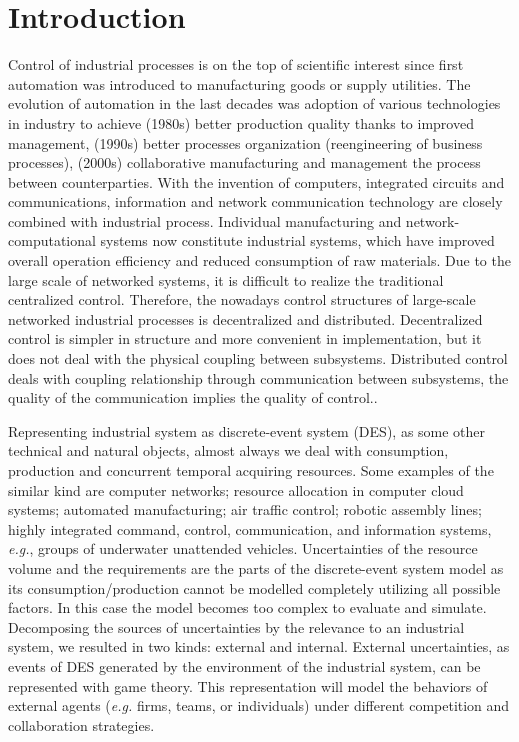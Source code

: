 \documentclass[runningheads]{llncs}
\begin{document}
\section*{Introduction}
\label{sec:intro}

Control of industrial processes is on the top of scientific interest since first automation was introduced to manufacturing goods or supply utilities. The evolution of automation in the last decades was adoption of various technologies in industry to achieve (1980s) better production quality thanks to improved management, (1990s) better processes organization (reengineering of business processes), (2000s) collaborative manufacturing and management the process between counterparties. With the invention of computers, integrated circuits and communications, information and network communication technology are closely combined with industrial process. Individual manufacturing and network-computational systems now constitute industrial systems, which have improved overall operation efficiency and reduced consumption of raw materials. Due to the large scale of networked systems, it is difficult to realize the traditional centralized control. Therefore, the nowadays control structures of large-scale networked industrial processes is decentralized and distributed. Decentralized control is simpler in structure and more convenient in implementation, but it does not deal with the physical coupling between subsystems. Distributed control deals with coupling relationship through communication between subsystems, the quality of the communication implies the quality of control..


Representing industrial system as discrete-event system (DES), as some other technical and natural objects, almost always we deal with consumption, production and concurrent temporal acquiring resources. Some examples of the similar kind are computer networks; resource allocation in computer cloud systems; automated manufacturing; air traffic control; robotic assembly lines; highly integrated command, control, communication, and information systems, \emph{e.g.}, groups of underwater unattended vehicles.  Uncertainties of the resource volume and the requirements are the parts of the discrete-event system model as its consumption/production cannot be modelled completely utilizing all possible factors. In this case the model becomes too complex to evaluate and simulate. Decomposing the sources of uncertainties by the relevance to an industrial system, we resulted in two kinds: external and internal.  External uncertainties, as events of DES generated by the environment of the industrial system, can be represented with game theory.  This representation will model the behaviors of external agents (\emph{e.g.} firms, teams, or individuals) under different competition and collaboration strategies.
\end{document}
